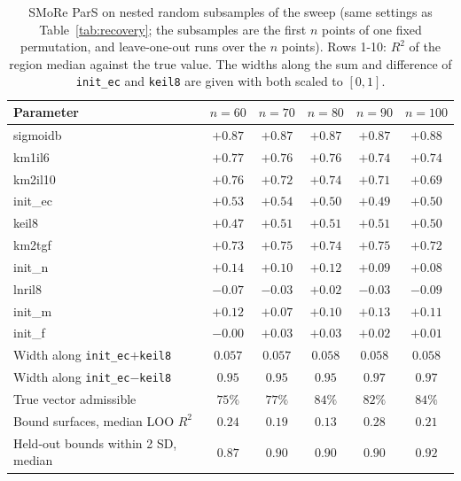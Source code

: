 \begin{table}[!htbp]
\caption{SMoRe ParS on nested random subsamples of the sweep (same settings as Table~\ref{tab:recovery}; the subsamples are the first $n$ points of one fixed permutation, and leave-one-out runs over the $n$ points). Rows 1-10: $R^2$ of the region median against the true value. The widths along the sum and difference of \texttt{init\_ec} and \texttt{keil8} are given with both scaled to $[0,1]$.}
\label{tab:learning_curve}
\centering\footnotesize
\begin{tabular}{lccccc}
\toprule
\textbf{Parameter} & $n=60$ & $n=70$ & $n=80$ & $n=90$ & $n=100$ \\
\midrule
sigmoidb & $+0.87$ & $+0.87$ & $+0.87$ & $+0.87$ & $+0.88$ \\
km1il6 & $+0.77$ & $+0.76$ & $+0.76$ & $+0.74$ & $+0.74$ \\
km2il10 & $+0.76$ & $+0.72$ & $+0.74$ & $+0.71$ & $+0.69$ \\
init\_ec & $+0.53$ & $+0.54$ & $+0.50$ & $+0.49$ & $+0.50$ \\
keil8 & $+0.47$ & $+0.51$ & $+0.51$ & $+0.51$ & $+0.50$ \\
km2tgf & $+0.73$ & $+0.75$ & $+0.74$ & $+0.75$ & $+0.72$ \\
init\_n & $+0.14$ & $+0.10$ & $+0.12$ & $+0.09$ & $+0.08$ \\
lnril8 & $-0.07$ & $-0.03$ & $+0.02$ & $-0.03$ & $-0.09$ \\
init\_m & $+0.12$ & $+0.07$ & $+0.10$ & $+0.13$ & $+0.11$ \\
init\_f & $-0.00$ & $+0.03$ & $+0.03$ & $+0.02$ & $+0.01$ \\
\midrule
Width along \texttt{init\_ec}$+$\texttt{keil8} & $0.057$ & $0.057$ & $0.058$ & $0.058$ & $0.058$ \\
Width along \texttt{init\_ec}$-$\texttt{keil8} & $0.95$ & $0.95$ & $0.95$ & $0.97$ & $0.97$ \\
True vector admissible & $75\%$ & $77\%$ & $84\%$ & $82\%$ & $84\%$ \\
Bound surfaces, median LOO $R^2$ & $0.24$ & $0.19$ & $0.13$ & $0.28$ & $0.21$ \\
Held-out bounds within 2 SD, median & $0.87$ & $0.90$ & $0.90$ & $0.90$ & $0.92$ \\
\bottomrule
\end{tabular}
\end{table}
